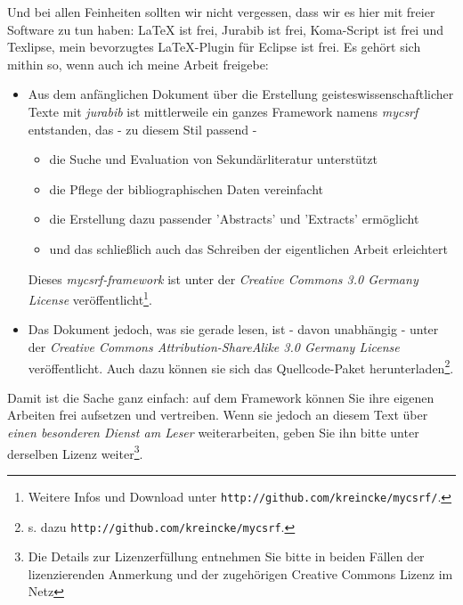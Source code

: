 Und bei allen Feinheiten sollten wir nicht vergessen, dass wir es hier mit
freier Software zu tun haben: LaTeX ist frei, Jurabib ist frei, Koma-Script ist
frei und Texlipse, mein bevorzugtes LaTeX-Plugin für Eclipse ist frei. Es gehört
sich mithin so, wenn auch ich meine Arbeit freigebe: 

\begin{itemize}
  \item Aus dem anfänglichen Dokument über die Erstellung
  geisteswissenschaftlicher Texte mit \textit{jurabib} ist mittlerweile ein
  ganzes Framework namens \textit{mycsrf} entstanden, das - zu diesem Stil
  passend -
  \begin{itemize}
    \item die Suche und Evaluation von Sekundärliteratur unterstützt
    \item die Pflege der bibliographischen Daten vereinfacht
    \item die Erstellung dazu passender 'Abstracts' und 'Extracts' ermöglicht
    \item und das schließlich auch das Schreiben der eigentlichen Arbeit
    erleichtert
  \end{itemize}
  Dieses \textit{mycsrf-framework} ist unter der \textit{Creative Commons
  3.0 Germany License} veröffentlicht\footnote{Weitere Infos und Download unter
  \texttt{http://github.com/kreincke/mycsrf/}.}.
  \item Das Dokument jedoch, was sie gerade lesen, ist - davon unabhängig -
  unter der \textit{Creative Commons Attribution-ShareAlike 3.0 Germany License}
  veröffentlicht. Auch dazu können sie sich das Quellcode-Paket
  herunterladen\footnote{s. dazu
  \texttt{http://github.com/kreincke/mycsrf}.}.
\end{itemize}

Damit ist die Sache ganz einfach: auf dem Framework können Sie ihre eigenen
Arbeiten frei aufsetzen und vertreiben. Wenn sie jedoch an diesem Text über
\textit{einen besonderen Dienst am Leser} weiterarbeiten, geben Sie ihn bitte
unter derselben Lizenz weiter\footnote{Die Details zur Lizenzerfüllung entnehmen
Sie bitte in beiden Fällen der lizenzierenden Anmerkung und der zugehörigen
Creative Commons Lizenz im Netz}.

